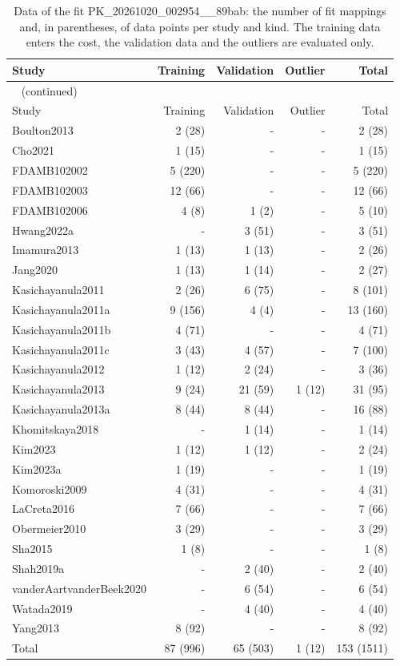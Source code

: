\documentclass{article}
\begin{document}
\begin{longtable}{lrrrr}
\caption{Data of the fit PK\_20261020\_002954\_\_89bab: the number of fit mappings and, in parentheses, of data points per study and kind. The training data enters the cost, the validation data and the outliers are evaluated only.}\label{tab:data:PK_20261020_002954__89bab} \\
\toprule
Study & Training & Validation & Outlier & Total \\
\midrule
\endfirsthead
\multicolumn{5}{l}{\small\tablename~\thetable{} (continued)} \\
\toprule
Study & Training & Validation & Outlier & Total \\
\midrule
\endhead
\bottomrule
\endlastfoot
Boulton2013 & 2 (28) & - & - & 2 (28) \\
Cho2021 & 1 (15) & - & - & 1 (15) \\
FDAMB102002 & 5 (220) & - & - & 5 (220) \\
FDAMB102003 & 12 (66) & - & - & 12 (66) \\
FDAMB102006 & 4 (8) & 1 (2) & - & 5 (10) \\
Hwang2022a & - & 3 (51) & - & 3 (51) \\
Imamura2013 & 1 (13) & 1 (13) & - & 2 (26) \\
Jang2020 & 1 (13) & 1 (14) & - & 2 (27) \\
Kasichayanula2011 & 2 (26) & 6 (75) & - & 8 (101) \\
Kasichayanula2011a & 9 (156) & 4 (4) & - & 13 (160) \\
Kasichayanula2011b & 4 (71) & - & - & 4 (71) \\
Kasichayanula2011c & 3 (43) & 4 (57) & - & 7 (100) \\
Kasichayanula2012 & 1 (12) & 2 (24) & - & 3 (36) \\
Kasichayanula2013 & 9 (24) & 21 (59) & 1 (12) & 31 (95) \\
Kasichayanula2013a & 8 (44) & 8 (44) & - & 16 (88) \\
Khomitskaya2018 & - & 1 (14) & - & 1 (14) \\
Kim2023 & 1 (12) & 1 (12) & - & 2 (24) \\
Kim2023a & 1 (19) & - & - & 1 (19) \\
Komoroski2009 & 4 (31) & - & - & 4 (31) \\
LaCreta2016 & 7 (66) & - & - & 7 (66) \\
Obermeier2010 & 3 (29) & - & - & 3 (29) \\
Sha2015 & 1 (8) & - & - & 1 (8) \\
Shah2019a & - & 2 (40) & - & 2 (40) \\
vanderAartvanderBeek2020 & - & 6 (54) & - & 6 (54) \\
Watada2019 & - & 4 (40) & - & 4 (40) \\
Yang2013 & 8 (92) & - & - & 8 (92) \\
Total & 87 (996) & 65 (503) & 1 (12) & 153 (1511) \\
\end{longtable}
\end{document}
